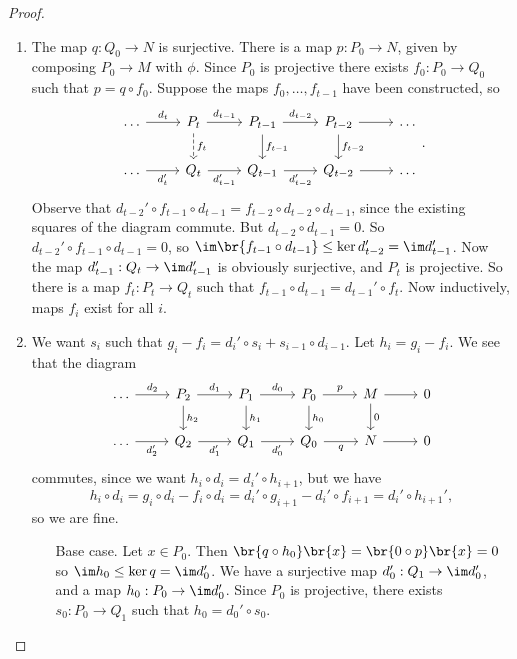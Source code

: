 \begin{proof}
\hfill
\begin{enumerate}
\item The map $ q : Q_0 \to N $ is surjective. There is a map $ p : P_0 \to N $, given by composing $ P_0 \to M $ with $ \phi $. Since $ P_0 $ is projective there exists $ f_0 : P_0 \to Q_0 $ such that $ p = q \circ f_0 $. Suppose the maps $ f_0, \dots, f_{t - 1} $ have been constructed, so
$$
\begin{tikzcd}
\dots \arrow{r}{d_t} & P_t \arrow{r}{d_{t - 1}} \arrow[dashed]{d}{f_t} & P_{t - 1} \arrow{r}{d_{t - 2}} \arrow{d}{f_{t - 1}} & P_{t - 2} \arrow{d}{f_{t - 2}} \arrow{r} & \dots \\
\dots \arrow{r}[swap]{d_t'} & Q_t \arrow{r}[swap]{d_{t - 1}'} & Q_{t - 1} \arrow{r}[swap]{d_{t - 2}'} & Q_{t - 2} \arrow{r} & \dots
\end{tikzcd}.
$$
Observe that $ d_{t - 2}' \circ f_{t - 1} \circ d_{t - 1} = f_{t - 2} \circ d_{t - 2} \circ d_{t - 1} $, since the existing squares of the diagram commute. But $ d_{t - 2} \circ d_{t - 1} = 0 $. So $ d_{t - 2}' \circ f_{t - 1} \circ d_{t - 1} = 0 $, so $ \im \br{f_{t - 1} \circ d_{t - 1}} \le \ker d_{t - 2}' = \im d_{t - 1}' $. Now the map $ d_{t - 1}' : Q_t \to \im d_{t - 1}' $ is obviously surjective, and $ P_t $ is projective. So there is a map $ f_t : P_t \to Q_t $ such that $ f_{t - 1} \circ d_{t - 1} = d_{t - 1}' \circ f_t $. Now inductively, maps $ f_i $ exist for all $ i $.
\item We want $ s_i $ such that $ g_i - f_i = d_i' \circ s_i + s_{i - 1} \circ d_{i - 1} $. Let $ h_i = g_i - f_i $. We see that the diagram
$$
\begin{tikzcd}
\dots \arrow{r}{d_2} & P_2 \arrow{r}{d_1} \arrow{d}{h_2} & P_1 \arrow{r}{d_0} \arrow{d}{h_1} & P_0 \arrow{r}{p} \arrow{d}{h_0} & M \arrow{r} \arrow{d}{0} & 0 \\
\dots \arrow{r}[swap]{d_2'} & Q_2 \arrow{r}[swap]{d_1'} & Q_1 \arrow{r}[swap]{d_0'} & Q_0 \arrow{r}[swap]{q} & N \arrow{r} & 0
\end{tikzcd}
$$
commutes, since we want $ h_i \circ d_i = d_i' \circ h_{i + 1} $, but we have
$$ h_i \circ d_i = g_i \circ d_i - f_i \circ d_i = d_i' \circ g_{i + 1} - d_i' \circ f_{i + 1} = d_i' \circ h_{i + 1}', $$
so we are fine.
\begin{itemize}[leftmargin=1in]
\item[Base case.] Let $ x \in P_0 $. Then $ \br{q \circ h_0}\br{x} = \br{0 \circ p}\br{x} = 0 $ so $ \im h_0 \le \ker q = \im d_0' $. We have a surjective map $ d_0' : Q_1 \to \im d_0' $, and a map $ h_0 : P_0 \to \im d_0' $. Since $ P_0 $ is projective, there exists $ s_0 : P_0 \to Q_1 $ such that $ h_0 = d_0' \circ s_0 $.

\end{itemize}
\end{enumerate}
\end{proof}
